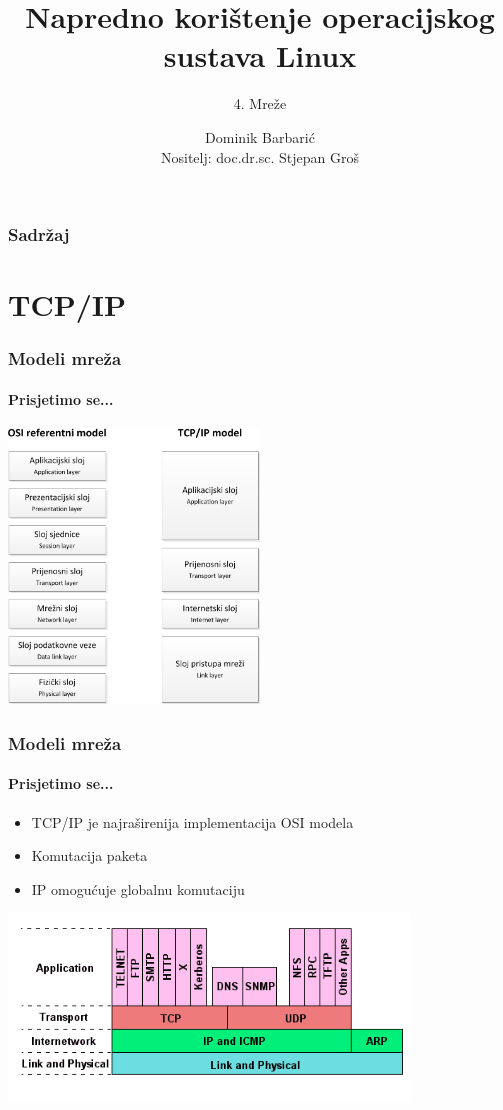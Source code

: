 \documentclass[t,table,usenames,dvipsnames]{beamer}
\date{\todayiso}
\title[NKOSL]{Napredno korištenje operacijskog sustava Linux}
\author[Dominik Barbarić]{Dominik Barbarić\\{\small Nositelj: doc.dr.sc. Stjepan Groš}}
\subtitle{4. Mreže}
\institute[FER]{Sveučilište u Zagrebu\\Fakultet elektrotehnike i računarstva}
\begin{document}
{
	\begin{frame}
		\maketitle
	\end{frame}
}

\begin{frame}
	\frametitle{Sadržaj}
	\tableofcontents
\end{frame}

\section{TCP/IP}

\begin{frame}
	\frametitle{Modeli mreža}
	\framesubtitle{Prisjetimo se...}
	\centering
	\includegraphics[width=0.5\textwidth]{osi_tcpip.png}
\end{frame}

\begin{frame}
	\frametitle{Modeli mreža}
	\framesubtitle{Prisjetimo se...}
	\begin{itemize}
		\item TCP/IP je najraširenija implementacija OSI modela
		\item Komutacija paketa
		\item IP omogućuje globalnu komutaciju
	\end{itemize}
	\vfill
	\includegraphics[width=0.8\textwidth]{service_layer.png}
\end{frame}
\end{document}
